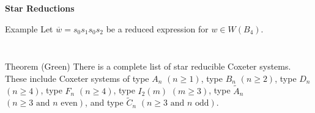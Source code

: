 \documentclass{beamer}
\newcommand{\w}{\overline{w}}
\newcommand\heapblock[4]{\fill[fill=#4, fill opacity=0.35, draw=#4, line width=1.1pt, rounded corners,shift={(\xxaxis:#1)},shift={(\yyaxis:#2)}] (-1,-1) rectangle (1,1);\node at (#1,#2) {\footnotesize $#3$};}
\newcommand\xxaxis{0}
\newcommand\yyaxis{90}
\begin{document}
\begin{frame}{\textbf{Star Reductions}}
\begin{block}{Example}
Let $\w=s_0s_1s_0s_2$ be a reduced expression for $w \in W(B_4)$.

\begin{columns}
\begin{column}{0.4\textwidth}
\begin{figure} \centering
{}
\end{figure}
\end{column}

\pause

\begin{column}{0.4\textwidth}
\begin{figure} \centering
{}
\end{figure}
\end{column}
\end{columns}
	
\end{block}

\pause

\begin{block}{Theorem (Green)}
	There is a complete list of star reducible Coxeter systems. These include Coxeter systems of type $A_n$ $(n \geq 1)$, type $B_n$ $(n \geq 2)$, type $D_n$ $(n \geq 4)$, type $F_n$ $(n \geq 4)$, type $I_2(m)$ $(m \geq 3)$, type $\widetilde{A}_{n}$ $(n \geq 3 \text{ and } n \text{ even})$, and type $\widetilde{C}_{n}$ $(n\geq 3 \text{ and } n \text{ odd})$.
\end{block}
	
\end{frame}

\end{document}
